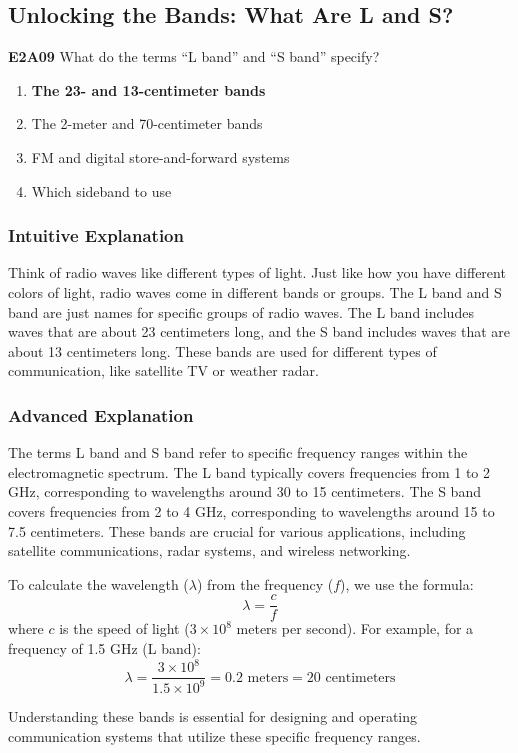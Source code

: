 \subsection{Unlocking the Bands: What Are L and S?}

\begin{tcolorbox}[colback=blue!5!white,colframe=blue!75!black]
    \textbf{E2A09} What do the terms “L band” and “S band” specify?
    \begin{enumerate}[label=\Alph*.]
        \item \textbf{The 23- and 13-centimeter bands}
        \item The 2-meter and 70-centimeter bands
        \item FM and digital store-and-forward systems
        \item Which sideband to use
    \end{enumerate}
\end{tcolorbox}

\subsubsection{Intuitive Explanation}
Think of radio waves like different types of light. Just like how you have different colors of light, radio waves come in different bands or groups. The L band and S band are just names for specific groups of radio waves. The L band includes waves that are about 23 centimeters long, and the S band includes waves that are about 13 centimeters long. These bands are used for different types of communication, like satellite TV or weather radar.

\subsubsection{Advanced Explanation}
The terms L band and S band refer to specific frequency ranges within the electromagnetic spectrum. The L band typically covers frequencies from 1 to 2 GHz, corresponding to wavelengths around 30 to 15 centimeters. The S band covers frequencies from 2 to 4 GHz, corresponding to wavelengths around 15 to 7.5 centimeters. These bands are crucial for various applications, including satellite communications, radar systems, and wireless networking.

To calculate the wavelength (\(\lambda\)) from the frequency (\(f\)), we use the formula:
\[
\lambda = \frac{c}{f}
\]
where \(c\) is the speed of light (\(3 \times 10^8\) meters per second). For example, for a frequency of 1.5 GHz (L band):
\[
\lambda = \frac{3 \times 10^8}{1.5 \times 10^9} = 0.2 \text{ meters} = 20 \text{ centimeters}
\]

Understanding these bands is essential for designing and operating communication systems that utilize these specific frequency ranges.

